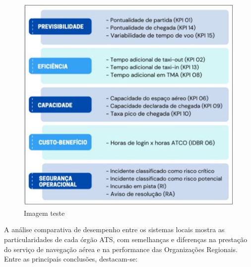 \documentclass[
]{book}
\theoremstyle{definition}
\theoremstyle{definition}
\theoremstyle{definition}
\theoremstyle{definition}
\theoremstyle{remark}
\begin{document}
\begin{figure}
\centering
\includegraphics{imagens/fig1.jpg}
\caption{Imagem teste}
\end{figure}

A análise comparativa de desempenho entre os sistemas locais mostra as particularidades de cada órgão ATS, com semelhanças e diferenças na prestação do serviço de navegação aérea e na performance das Organizações Regionais. Entre as principais conclusões, destacam-se:
\end{document}
